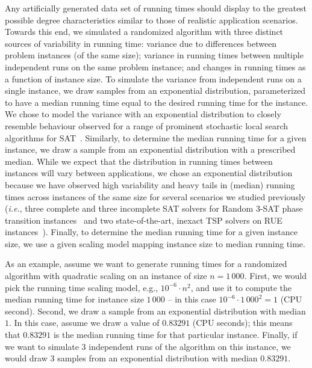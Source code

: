 \documentclass[aic]{iosart2x}
\newcommand{\ie}{\emph{i.e.}}
\begin{document}
Any artificially generated data set of running times should display to the greatest possible degree characteristics similar to those of realistic application scenarios. 
Towards this end, we simulated a randomized algorithm with three distinct sources of variability in running time: 
variance due to differences between problem instances (of the same size); variance in running times between multiple independent runs on the same problem instance; and changes in running times as a function of instance size.
To simulate the variance from independent runs on a single instance, we draw samples from an exponential distribution, parameterized to have a median running time equal to the desired running time for the instance. 
We chose to model the variance with an exponential distribution to closely resemble behaviour observed for a range of prominent stochastic local search algorithms for SAT~\cite{HooStu99}. 
Similarly, to determine the median running time for a given instance, we draw a sample from an exponential distribution with a prescribed median. While we expect that the distribution in running times between instances will vary between applications, we chose an exponential distribution because we have observed high variability and heavy tails in (median) running times across instances of the same size for several scenarios we studied previously (\ie{}, three complete and three incomplete SAT solvers for Random 3-SAT phase transition instances~\cite{MuHoo15} and two state-of-the-art, inexact TSP solvers on RUE instances~\cite{MuEtAl16}).
Finally, to determine the median running time for a given instance size, we use a given scaling model mapping instance size to median running time.

As an example, assume we want to generate running times for a randomized algorithm with quadratic scaling on an instance of size $n = 1\,000$. 
First, we would pick the running time scaling model, e.g., $10^{-6} \cdot n^2$, and use it to compute the median running time for instance size $1\,000$ -- in this case $10^{-6} \cdot 1\,000^2 = 1$ (CPU second). 
Second, we draw a sample from an exponential distribution with median $1$. 
In this case, assume we draw a value of $0.83291$ (CPU seconds); this means that $0.83291$ is the median running time for that particular instance. 
Finally, if we want to simulate 3 independent runs of the algorithm on this instance, we would draw 3 samples from an exponential distribution with median $0.83291$.
\end{document}
